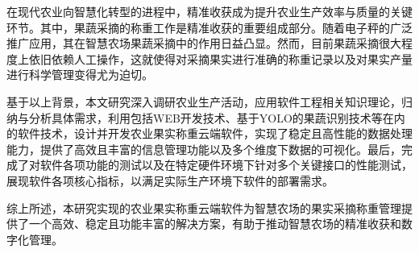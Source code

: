 在现代农业向智慧化转型的进程中，精准收获成为提升农业生产效率与质量的关键环节。其中，果蔬采摘的称重工作是精准收获的重要组成部分。随着电子秤的广泛推广应用，其在智慧农场果蔬采摘中的作用日益凸显。然而，目前果蔬采摘很大程度上依旧依赖人工操作，这就使得对采摘果实进行准确的称重记录以及对果实产量进行科学管理变得尤为迫切。

基于以上背景，本文研究深入调研农业生产活动，应用软件工程相关知识理论，归纳与分析具体需求，利用包括WEB开发技术、基于YOLO的果蔬识别技术等在内的软件技术，设计并开发农业果实称重云端软件，实现了稳定且高性能的数据处理能力，提供了高效且丰富的信息管理功能以及多个维度下数据的可视化。最后，完成了对软件各项功能的测试以及在特定硬件环境下针对多个关键接口的性能测试，展现软件各项核心指标，以满足实际生产环境下软件的部署需求。

综上所述，本研究实现的农业果实称重云端软件为智慧农场的果实采摘称重管理提供了一个高效、稳定且功能丰富的解决方案，有助于推动智慧农场的精准收获和数字化管理。 